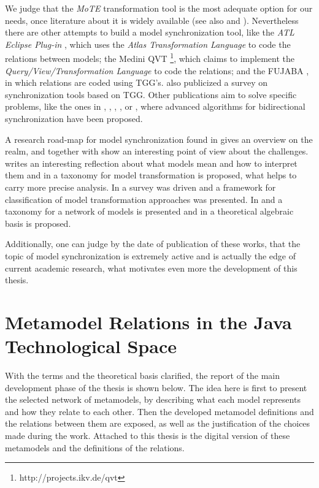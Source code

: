 \documentclass[tuberlin,cic,tc,english,noabntcite]{iiufrgs}
\begin{document}
We judge that the \emph{MoTE} transformation tool is the most adequate option for our needs, once literature about it is widely available (see also \citep{giese2009efficient} and \citep{hildebrandt2012mdelab}). Nevertheless there are other attempts to build a model synchronization tool, like the \emph{ATL Eclipse Plug-in} \citep{jouault2008atl}, which uses the \emph{Atlas Transformation Language} to code the relations between models; the Medini QVT \footnote{http://projects.ikv.de/qvt}, which claims to implement the \emph{Query/View/Transformation Language} to code the relations; and the FUJABA \citep{nickel2000fujaba}, in which relations are coded using TGG's. \citet{hildebrandt2013survey} also publicized a survey on synchronization tools based on TGG. Other publications aim to solve specific problems, like the ones in \citet{hermann2011correctness}, \citet{xiong2007towards}, \citet{giese2006incremental}, \citet{ivkovic2004tracing}, or \citet{song2011instant}, where advanced algorithms for bidirectional synchronization have been proposed.

A research road-map for model synchronization found in \citet{france2007model} gives an overview on the realm, and together with \citet{mattsson2009linking} show an interesting point of view about the challenges. \citet{seidewitz2003models} writes an interesting reflection  about what models mean and how to interpret them and in \citet{mens2006taxonomy} a taxonomy for model transformation is proposed, what helps to carry more precise analysis. In \citet{czarnecki2006feature} a survey was driven and a framework for classification of model transformation approaches was presented. In \citeauthor{diskin2014towards} \citeyearpar{diskin2014towards} and \citeyearpar{diskin2016three} a taxonomy for a network of models is presented and in \citet{diskin2011model} a theoretical algebraic basis is proposed.

Additionally, one can judge by the date of publication of these works, that the topic of model synchronization is extremely active and is actually the edge of current academic research, what motivates even more the development of this thesis.

\chapter{Metamodel Relations in the Java Technological Space}
\label{chapter:metamodel_relations}
With the terms and the theoretical basis clarified, the report of the main development phase of the thesis is shown below. The idea here is first to present the selected network of metamodels, by describing what each model represents and how they relate to each other. Then the developed metamodel definitions and the relations between them are exposed, as well as the justification of the choices made during the work. Attached to this thesis is the digital version of these metamodels and the definitions of the relations.
\end{document}
